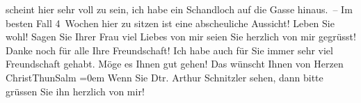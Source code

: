 \begin{ledgroupsized}[t]{13cm}
               scheint hier sehr voll zu sein, {\kaufmannsund} ich habe ein
               Schandloch auf die Gasse hinaus. –\pend
           \pstart
           Im besten Fall 4 Wochen hier zu sitzen ist eine abscheuliche Aussicht!\pend
           \pstart
           Leben Sie wohl! Sagen Sie Ihrer Frau viel Liebes von mir {\kaufmannsund} seien Sie herzlich
               von mir gegrüsst!\pend
           \pstart
           {\pb}Danke noch für alle Ihre
               Freundschaft! Ich habe auch für Sie immer sehr viel Freundschaft gehabt.\pend
           \pstart
           Möge es Ihnen gut gehen! Das wünscht Ihnen von
                  Herzen{\\[\baselineskip]}\spacefill\mbox{ChristThunSalm}\pend
           \leftskip=0em{}\pstart
           \noindent{}Wenn Sie Dtr. Arthur Schnitzler sehen, dann bitte grüssen Sie ihn herzlich von
                  mir!\pend
           
         
         \endnumbering{}\end{ledgroupsized}  \newcommand{\dateiname}{L01678}\newcommand{\titel}{Hugo von Hofmannsthal an Arthur Schnitzler mit Beilage Christiane Thun an Hofmannsthal, [25. 5. 1907]}\newcommand{\editorInnen}{Martin Anton Müller und Gerd-Hermann Susen}
      